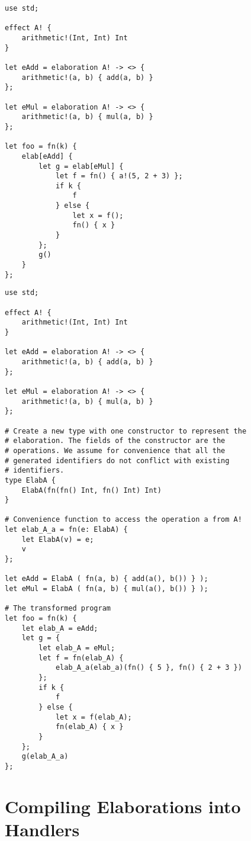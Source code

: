 \begin{lstlisting}[language=elaine,style=fancy,float,caption={Untransformed program. \fixme{This example should use a higher-order effect.}},label={lst:untransformed}]
use std;

effect A! {
    arithmetic!(Int, Int) Int
}

let eAdd = elaboration A! -> <> {
    arithmetic!(a, b) { add(a, b) }
};

let eMul = elaboration A! -> <> {
    arithmetic!(a, b) { mul(a, b) }
};

let foo = fn(k) {
    elab[eAdd] {
        let g = elab[eMul] {
            let f = fn() { a!(5, 2 + 3) };
            if k {
                f
            } else {
                let x = f();
                fn() { x }
            }
        };
        g()
    }
};
\end{lstlisting}
\begin{lstlisting}[language=elaine,style=fancy,float,caption={Transformed program after compiling elaborations to dictionary passing.},label={lst:transformed}]
use std;

effect A! {
    arithmetic!(Int, Int) Int
}

let eAdd = elaboration A! -> <> {
    arithmetic!(a, b) { add(a, b) }
};

let eMul = elaboration A! -> <> {
    arithmetic!(a, b) { mul(a, b) }
};

# Create a new type with one constructor to represent the
# elaboration. The fields of the constructor are the 
# operations. We assume for convenience that all the
# generated identifiers do not conflict with existing
# identifiers.
type ElabA {
    ElabA(fn(fn() Int, fn() Int) Int)
}

# Convenience function to access the operation a from A!
let elab_A_a = fn(e: ElabA) {
    let ElabA(v) = e;
    v
};

let eAdd = ElabA ( fn(a, b) { add(a(), b()) } );
let eMul = ElabA ( fn(a, b) { mul(a(), b()) } );

# The transformed program
let foo = fn(k) {
    let elab_A = eAdd;
    let g = {
        let elab_A = eMul;
        let f = fn(elab_A) {
            elab_A_a(elab_a)(fn() { 5 }, fn() { 2 + 3 })
        };
        if k {
            f
        } else {
            let x = f(elab_A);
            fn(elab_A) { x }
        }
    };
    g(elab_A_a)
};
\end{lstlisting}

\section{Compiling Elaborations into Handlers}

